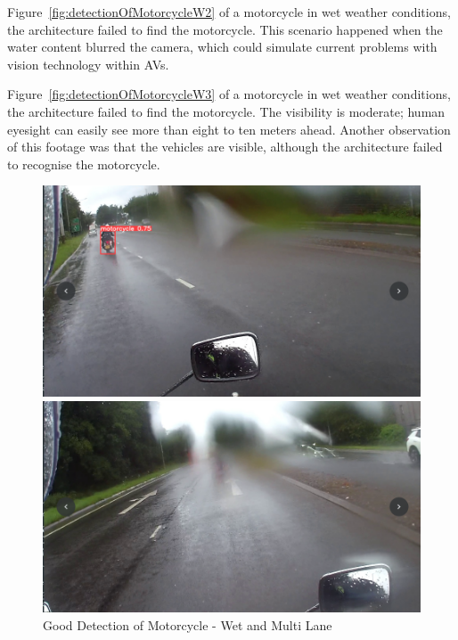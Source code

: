 \documentclass[conference]{IEEEtran}
\begin{document}
	Figure~\ref{fig:detectionOfMotorcycleW2} of a motorcycle in wet weather conditions, the architecture failed to find the motorcycle. This scenario happened when the water content blurred the camera, which could simulate current problems with vision technology within AVs.

	Figure~\ref{fig:detectionOfMotorcycleW3} of a motorcycle in wet weather conditions, the architecture failed to find the motorcycle. The visibility is moderate; human eyesight can easily see more than eight to ten meters ahead. Another observation of this footage was that the vehicles are visible, although the architecture failed to recognise the motorcycle.
	\begin{figure}[h]
		\centering
		\begin{minipage}{0.15\textwidth}
			\centering
			\includegraphics[width=\linewidth]{Figures/wet_correct.png}
			\caption{Good Detection of Motorcycle - Wet and Multi Lane}
			\label{fig:detectionOfMotorcycleW1}
		\end{minipage}\hfill
		\begin{minipage}{0.15\textwidth}
			\centering
			\includegraphics[width=\linewidth]{Figures/wet_incorrect.png}

\end{minipage}
\end{figure}
\end{document}
